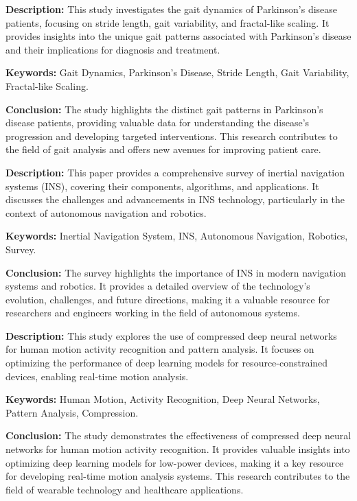 {
	\textbf{Description:} This study investigates the gait dynamics of Parkinson’s disease patients, focusing on stride length, gait variability, and fractal-like scaling. It provides insights into the unique gait patterns associated with Parkinson’s disease and their implications for diagnosis and treatment.
	\newline
	
	\textbf{Keywords:} Gait Dynamics, Parkinson’s Disease, Stride Length, Gait Variability, Fractal-like Scaling.
	
	\newpage
	\textbf{Conclusion:} The study highlights the distinct gait patterns in Parkinson’s disease patients, providing valuable data for understanding the disease’s progression and developing targeted interventions. This research contributes to the field of gait analysis and offers new avenues for improving patient care\cite{Hausdorff:2009}.
}

{
	\textbf{Description:} This paper provides a comprehensive survey of inertial navigation systems (INS), covering their components, algorithms, and applications. It discusses the challenges and advancements in INS technology, particularly in the context of autonomous navigation and robotics.
	\newline
	
	\textbf{Keywords:} Inertial Navigation System, INS, Autonomous Navigation, Robotics, Survey.
	
	\newpage
	\textbf{Conclusion:} The survey highlights the importance of INS in modern navigation systems and robotics. It provides a detailed overview of the technology’s evolution, challenges, and future directions, making it a valuable resource for researchers and engineers working in the field of autonomous systems\cite{Jung:2018}.
}

{
	\textbf{Description:} This study explores the use of compressed deep neural networks for human motion activity recognition and pattern analysis. It focuses on optimizing the performance of deep learning models for resource-constrained devices, enabling real-time motion analysis.
	\newline
	
	\textbf{Keywords:} Human Motion, Activity Recognition, Deep Neural Networks, Pattern Analysis, Compression.
	
	\newpage
	\textbf{Conclusion:} The study demonstrates the effectiveness of compressed deep neural networks for human motion activity recognition. It provides valuable insights into optimizing deep learning models for low-power devices, making it a key resource for developing real-time motion analysis systems. This research contributes to the field of wearable technology and healthcare applications\cite{Kumari2024}.
}


